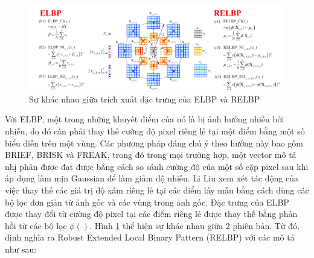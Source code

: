 \begin{figure} [h]
	\centering
	\includegraphics[width= 1\linewidth]{figures/elbpARelbp.png}
	\caption{Sự khác nhau giữa trích xuất đặc trưng của ELBP và RELBP \cite{Liu2016}}
	\label{fig:elbpARelbp}
\end{figure} 
Với ELBP, một trong những khuyết điểm của nó là bị ảnh hưởng nhiều bởi nhiễu, do đó cần phải thay thế cường độ pixel riêng lẻ tại một điểm bằng một số biểu diễn trên một vùng. Các phương pháp đáng chú ý theo hướng này bao gồm BRIEF, BRISK và FREAK, trong đó trong mọi trường hợp, một vector mô tả nhị phân được đạt được bằng cách so sánh cường độ của một số cặp pixel sau khi áp dụng làm mịn Gaussian để làm giảm độ nhiễu. Li Liu \cite{Liu2016} xem xét tác động của việc thay thế các giá trị độ xám riêng lẻ tại các điểm lấy mẫu bằng cách dùng các bộ lọc đơn giản từ ảnh gốc và các vùng trong ảnh gốc. Đặc trưng của ELBP được thay đổi từ cường độ pixel tại các điểm riêng lẻ được thay thế bằng phản hồi từ các bộ lọc $\phi()$. Hình \ref{fig:elbpARelbp} thể hiện sự khác nhau giữa 2 phiên bản. Từ đó, định nghĩa ra Robust Extended Local Binary Pattern (RELBP) với các mô tả như sau:

